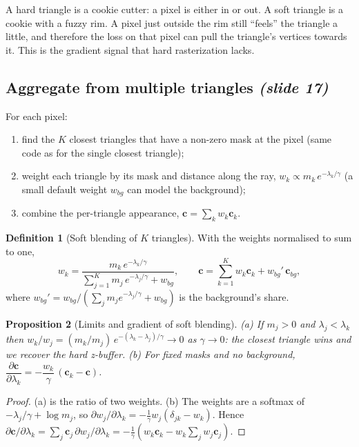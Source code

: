 \documentclass[11pt,a4paper]{article}
\newcommand{\sr}[1]{\texorpdfstring{\emph{(#1)}}{(#1)}}
\theoremstyle{definition}
\newtheorem{definition}{Definition}[section]
\theoremstyle{plain}
\newtheorem{proposition}[definition]{Proposition}
\theoremstyle{remark}
\begin{document}
\begin{intuition}
A hard triangle is a cookie cutter: a pixel is either in or out. A soft triangle is a cookie with a fuzzy rim. A pixel just outside the rim still ``feels'' the triangle a little, and therefore the loss on that pixel can pull the triangle's vertices towards it. This is the gradient signal that hard rasterization lacks.
\end{intuition}

\subsection{Aggregate from multiple triangles \sr{slide 17}}
For each pixel:
\begin{enumerate}[nosep]
\item find the $K$ closest triangles that have a non-zero mask at the pixel (same code as for the single closest triangle);
\item weight each triangle by its mask and distance along the ray, $w_k\propto m_k\,e^{-\lambda_k/\gamma}$ (a small default weight $w_{bg}$ can model the background);
\item combine the per-triangle appearance, $\bm c=\sum_k w_k\bm c_k$.
\end{enumerate}

\begin{definition}[Soft blending of $K$ triangles]
With the weights normalised to sum to one,
\[
w_k=\frac{m_k\,e^{-\lambda_k/\gamma}}{\sum_{j=1}^{K}m_j\,e^{-\lambda_j/\gamma}+w_{bg}},\qquad
\bm c=\sum_{k=1}^{K}w_k\bm c_k+w_{bg}'\,\bm c_{bg},
\]
where $w_{bg}'=w_{bg}/(\sum_j m_je^{-\lambda_j/\gamma}+w_{bg})$ is the background's share.
\end{definition}

\begin{proposition}[Limits and gradient of soft blending]\label{prop:softblend}
(a) If $m_j>0$ and $\lambda_j<\lambda_k$ then $w_k/w_j=(m_k/m_j)\,e^{-(\lambda_k-\lambda_j)/\gamma}\to0$ as $\gamma\to0$: the closest triangle wins and we recover the hard z-buffer. (b) For fixed masks and no background, $\dfrac{\partial\bm c}{\partial\lambda_k}=-\dfrac{w_k}{\gamma}\,(\bm c_k-\bm c)$.
\end{proposition}
\begin{proof}
(a) is the ratio of two weights. (b) The weights are a softmax of $-\lambda_j/\gamma+\log m_j$, so $\partial w_j/\partial\lambda_k=-\tfrac1\gamma w_j(\delta_{jk}-w_k)$. Hence $\partial\bm c/\partial\lambda_k=\sum_j\bm c_j\,\partial w_j/\partial\lambda_k=-\tfrac1\gamma(w_k\bm c_k-w_k\sum_jw_j\bm c_j)$.
\end{proof}
\end{document}
